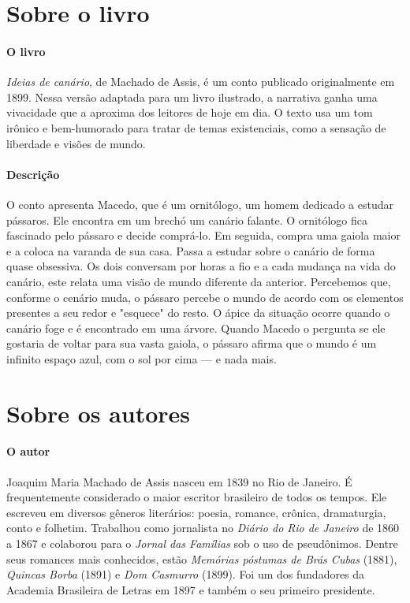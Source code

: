 \documentclass[11pt]{extarticle}
\begin{document}
\section{Sobre o livro}

\paragraph{O livro} \textit{Ideias de canário}, de Machado de Assis, é um conto publicado originalmente em 1899. Nessa versão adaptada para um livro ilustrado, a narrativa ganha uma vivacidade que a aproxima dos leitores de hoje em dia. O texto usa um tom irônico e bem-humorado para tratar de temas existenciais, como a sensação de liberdade e visões de mundo.

\paragraph{Descrição} O conto apresenta Macedo, que é um ornitólogo, um homem dedicado a estudar pássaros. Ele encontra em um brechó um canário falante. O ornitólogo fica fascinado pelo pássaro e decide comprá-lo. Em seguida, compra uma gaiola maior e a coloca na varanda de sua casa. Passa a estudar sobre o canário de forma quase obsessiva. Os dois conversam por horas a fio e a cada mudança na vida do canário, este relata uma visão de mundo diferente da anterior. Percebemos que, conforme o cenário muda, o pássaro percebe o mundo de acordo com os elementos presentes a seu redor e "esquece" do resto. O ápice da situação ocorre quando o canário foge e é encontrado em uma árvore. Quando Macedo o pergunta se ele gostaria de voltar para sua vasta gaiola, o pássaro afirma que o mundo é um infinito espaço azul, com o sol por cima --- e nada mais.

\section{Sobre os autores}

\paragraph{O autor} Joaquim Maria Machado de Assis nasceu em 1839 no Rio de Janeiro. É frequentemente considerado o maior escritor
brasileiro de todos os tempos. Ele escreveu em diversos gêneros literários: poesia, romance, crônica, dramaturgia, conto e folhetim. Trabalhou como jornalista no \textit{Diário do Rio de Janeiro} de 1860 a 1867 e colaborou para o \textit{Jornal das Famílias} sob o uso de pseudônimos. Dentre seus romances mais conhecidos, estão \textit{Memórias póstumas de Brás Cubas} (1881), \textit{Quincas Borba} (1891) e \textit{Dom Casmurro} (1899). Foi um dos fundadores da Academia Brasileira de Letras em 1897 e também o seu primeiro presidente.
\end{document}
